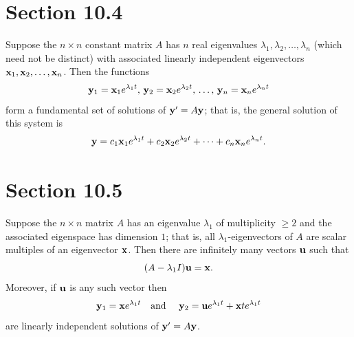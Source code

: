 \section*{Section 10.4}
\setcounter{chapter}{10}
\setcounter{section}{4}

\setcounter{theorem}{0}
\begin{theorem}
  \label{thmtype:10.4.1} Suppose the $n\times n$ constant matrix $A$ has $n$ real eigenvalues
  $\lambda_{1},\lambda_{2},\ldots,\lambda_{n}$ {\rm(}which need not be distinct{\rm)} with
  associated linearly independent eigenvectors ${\bf x}_{1},{\bf x}_{2},\ldots,{\bf x}_{n}$. Then
  the functions
  \[
    {\bf y}_{1}={\bf x}_{1}e^{\lambda_{1}t},\,{\bf y}_{2}={\bf x}_{2}e^{\lambda_{2}t},\, \dots,\,{\bf y}_{n}={\bf x}_{n}e^{\lambda_{n}t}
  \]
  form a fundamental set of solutions of ${\bf y}'=A{\bf y}$; that is, the general solution of this
  system is
  \[
    {\bf y}=c_{1}{\bf x}_{1}e^{\lambda_{1}t}+c_{2}{\bf x}_{2}e^{\lambda_{2}t}+\cdots+c_{n}{\bf x}_{n}e^{\lambda_{n}t}.
  \]
\end{theorem}

\section*{Section 10.5}
\setcounter{chapter}{10}
\setcounter{section}{5}

\setcounter{theorem}{0}
\setcounter{equation}{1}
\begin{theorem}
  \label{thmtype:10.5.1} Suppose the $n\times n$ matrix $A$ has an eigenvalue $\lambda_{1}$ of
  multiplicity $\ge2$ and the associated eigenspace has dimension $1$; that is, all
  $\lambda_{1}$-eigenvectors of $A$ are scalar multiples of an eigenvector ${\bf x}$. Then there are
  infinitely many vectors ${\bf u}$ such that
  \begin{equation}
    \label{eq:10.5.2}(A-\lambda_{1}I){\bf u}={\bf x}.
  \end{equation}
  Moreover, if ${\bf u}$ is any such vector then
  \begin{equation}
    \label{eq:10.5.3}{\bf y}_{1}={\bf x}e^{\lambda_{1}t}\quad\mbox{and }\quad{\bf y}_{2}={\bf u}e^{\lambda_{1}t}+{\bf x}te^{\lambda_{1}t}
  \end{equation}
  are linearly independent solutions of ${\bf y}'=A{\bf y}$.
\end{theorem}

